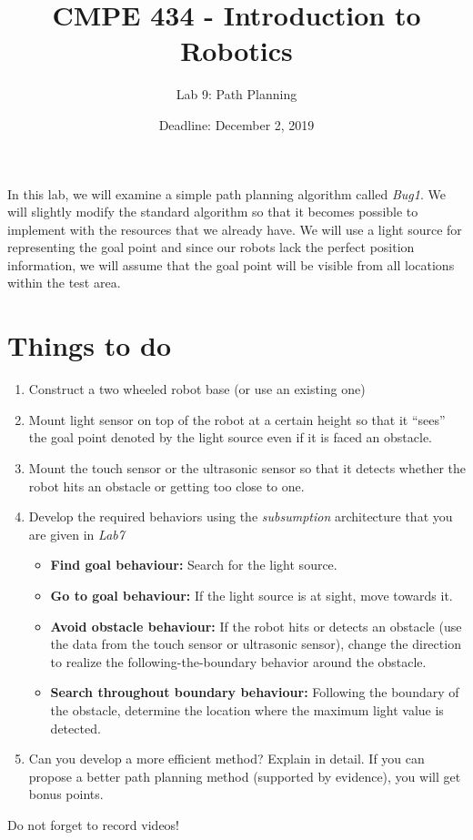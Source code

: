\documentclass{scrartcl}
\title{CMPE 434 - Introduction to Robotics}
\subtitle{Lab 9: Path Planning}
\date{Deadline: December 2, 2019}
\begin{document}
\maketitle

In this lab, we will examine a simple path planning algorithm called \emph{Bug1}. We will slightly modify the standard algorithm so that it becomes possible to implement with the resources that we already have. We will use a light source for representing the goal point and since our robots lack the perfect position information, we will assume that the goal point will be visible from all locations within the test area.

\section{Things to do}

\begin{enumerate}
    \def\labelenumi{\arabic{enumi}.}
    \item Construct a two wheeled robot base (or use an existing one)
    \item Mount light sensor on top of the robot at a certain height so that it ``sees'' the goal point denoted by the light source even if it is faced an obstacle.
    \item Mount the touch sensor or the ultrasonic sensor so that it detects whether the robot hits an obstacle or getting too close to one.
    \item Develop the required behaviors using the \emph{subsumption} architecture that you are given in \textit{Lab7}
    \begin{itemize}
        \item \textbf{Find goal behaviour:} Search for the light source.
        \item \textbf{Go to goal behaviour:} If the light source is at sight, move towards it.
        \item \textbf{Avoid obstacle behaviour:} If the robot hits or detects an obstacle (use the data from the touch sensor or ultrasonic sensor), change the direction to realize the following-the-boundary behavior around the obstacle.
        \item \textbf{Search throughout boundary behaviour:} Following the boundary of the obstacle, determine the location where the maximum light value is detected.
    \end{itemize}
    \item Can you develop a more efficient method? Explain in detail. If you can propose a better path planning method (supported by evidence), you will get bonus points.
\end{enumerate}

Do not forget to record videos!
\end{document}
